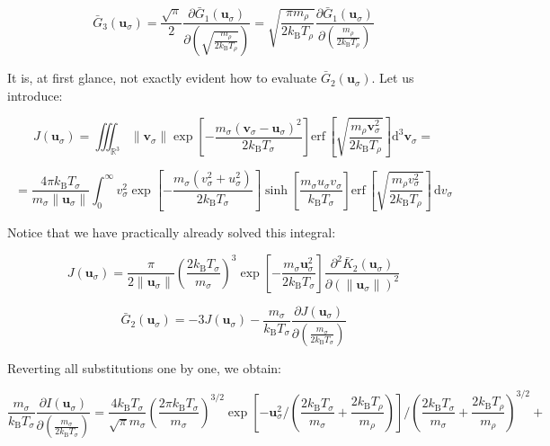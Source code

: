 \begin{equation}
    \bar{G}_3(\mathbf{u}_\sigma)=\frac{\sqrt{\pi}}{2}\frac{\partial\bar{G}_1(\mathbf{u}_\sigma)}{\partial\left(\sqrt{\frac{m_\rho}{2k_\mathrm{B}T_\rho}}\right)}=\sqrt{\frac{\pi m_\rho}{2k_\mathrm{B}T_\rho}}\frac{\partial\bar{G}_1(\mathbf{u}_\sigma)}{\partial\left(\frac{m_\rho}{2k_\mathrm{B}T_\rho}\right)}
\end{equation}

It is, at first glance, not exactly evident how to evaluate $\bar{G}_2(\mathbf{u}_\sigma)$. Let us introduce:

\begin{equation}
    J(\mathbf{u}_\sigma)=\iiint_{\mathbb{R}^3}\|\mathbf{v}_\sigma\|\exp{\left[-\frac{m_\sigma(\mathbf{v}_\sigma-\mathbf{u}_\sigma)^2}{2k_\mathrm{B}T_\sigma}\right]}\text{erf}\,\left[\sqrt{\frac{m_\rho\mathbf{v}_\sigma^2}{2k_\mathrm{B}T_\rho}}\right]\mathrm{d}^3\mathbf{v}_\sigma=
\end{equation}

\begin{equation}
    =\frac{4\pi k_\mathrm{B}T_\sigma}{m_\sigma\|\mathbf{u}_\sigma\|}\int_{0}^\infty v_\sigma^2\exp{\left[-\frac{m_\sigma(v_\sigma^2+u_\sigma^2)}{2k_\mathrm{B}T_\sigma}\right]}\sinh{\left[\frac{m_\sigma u_\sigma v_\sigma}{k_\mathrm{B}T_\sigma}\right]}\text{erf}\,\left[\sqrt{\frac{m_\rho v_\sigma^2}{2k_\mathrm{B}T_\rho}}\right]\,\mathrm{d}v_\sigma
\end{equation}

Notice that we have practically already solved this integral:

\begin{equation}
    J(\mathbf{u}_\sigma)=\frac{\pi}{2\|\mathbf{u}_\sigma\|}\left(\frac{2k_\mathrm{B}T_\sigma}{m_\sigma}\right)^3\exp{\left[-\frac{m_\sigma\mathbf{u}_\sigma^2}{2k_\mathrm{B}T_\sigma}\right]}\frac{\partial^2\bar{K}_2(\mathbf{u}_\sigma)}{\partial(\|\mathbf{u}_\sigma\|)^2}
\end{equation}

\begin{equation}
    \bar{G}_2(\mathbf{u}_\sigma)=-3J(\mathbf{u}_\sigma)-\frac{m_\sigma}{k_\mathrm{B}T_\sigma}\frac{\partial J(\mathbf{u}_\sigma)}{\partial\left(\frac{m_\sigma}{2k_\mathrm{B}T_\sigma}\right)}
\end{equation}

Reverting all substitutions one by one, we obtain:

\begin{equation*}
    \frac{m_\sigma}{k_\mathrm{B}T_\sigma}\frac{\partial I(\mathbf{u}_\sigma)}{\partial\left(\frac{m_\sigma}{2k_\mathrm{B}T_\sigma}\right)}=\frac{4k_\mathrm{B}T_\sigma}{\sqrt{\pi}m_\sigma}\left(\frac{2\pi k_\mathrm{B}T_\sigma}{m_\sigma}\right)^{3/2}\exp{\left[-\mathbf{u}_\sigma^2\bigg/\left(\frac{2k_\mathrm{B}T_\sigma}{m_\sigma}+\frac{2k_\mathrm{B}T_\rho}{m_\rho}\right)\right]}\bigg/\left(\frac{2k_\mathrm{B}T_\sigma}{m_\sigma}+\frac{2k_\mathrm{B}T_\rho}{m_\rho}\right)^{3/2}+
\end{equation*}

